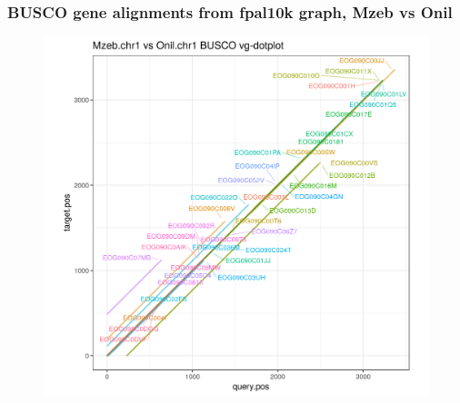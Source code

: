 \documentclass[aspectratio=169]{beamer}
\begin{document}
\begin{frame}
  \frametitle{BUSCO gene alignments from fpal10k graph, Mzeb vs Onil}
  \begin{figure}
    \includegraphics[scale=0.42,center]{cichlid_chr1_fpal10k_busco_dotplot_Mzeb_Onil.png}
  \end{figure}
\end{frame}
\end{document}
